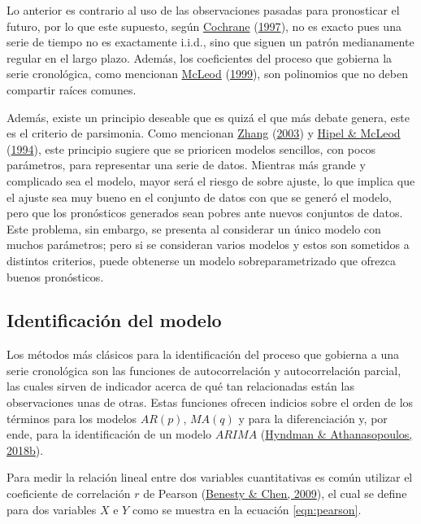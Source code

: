 \documentclass[
]{article}
\begin{document}
Lo anterior es contrario al uso de las observaciones pasadas para
pronosticar el futuro, por lo que este supuesto, según
\protect\hyperlink{ref-Cochrane}{Cochrane}
(\protect\hyperlink{ref-Cochrane}{1997}), no es exacto pues una serie de
tiempo no es exactamente i.i.d., sino que siguen un patrón medianamente
regular en el largo plazo. Además, los coeficientes del proceso que
gobierna la serie cronológica, como mencionan
\protect\hyperlink{ref-invertible_estacionario3}{McLeod}
(\protect\hyperlink{ref-invertible_estacionario3}{1999}), son polinomios
que no deben compartir raíces comunes.

Además, existe un principio deseable que es quizá el que más debate
genera, este es el criterio de parsimonia. Como mencionan
\protect\hyperlink{ref-Zhang}{Zhang}
(\protect\hyperlink{ref-Zhang}{2003}) y
\protect\hyperlink{ref-Hipel}{Hipel \& McLeod}
(\protect\hyperlink{ref-Hipel}{1994}), este principio sugiere que se
prioricen modelos sencillos, con pocos parámetros, para representar una
serie de datos. Mientras más grande y complicado sea el modelo, mayor
será el riesgo de sobre ajuste, lo que implica que el ajuste sea muy
bueno en el conjunto de datos con que se generó el modelo, pero que los
pronósticos generados sean pobres ante nuevos conjuntos de datos. Este
problema, sin embargo, se presenta al considerar un único modelo con
muchos parámetros; pero si se consideran varios modelos y estos son
sometidos a distintos criterios, puede obtenerse un modelo
sobreparametrizado que ofrezca buenos pronósticos.

\subsection{Identificación del modelo}

Los métodos más clásicos para la identificación del proceso que gobierna
a una serie cronológica son las funciones de autocorrelación y
autocorrelación parcial, las cuales sirven de indicador acerca de qué
tan relacionadas están las observaciones unas de otras. Estas funciones
ofrecen indicios sobre el orden de los términos para los modelos
\(AR(p)\), \(MA(q)\) y para la diferenciación y, por ende, para la
identificación de un modelo \(ARIMA\)
(\protect\hyperlink{ref-hyndman_box-jenkins}{Hyndman \& Athanasopoulos,
2018b}).

Para medir la relación lineal entre dos variables cuantitativas es común
utilizar el coeficiente de correlación \(r\) de Pearson
(\protect\hyperlink{ref-pearson}{Benesty \& Chen, 2009}), el cual se
define para dos variables \(X\) e \(Y\) como se muestra en la ecuación
\eqref{eqn:pearson}.
\end{document}
